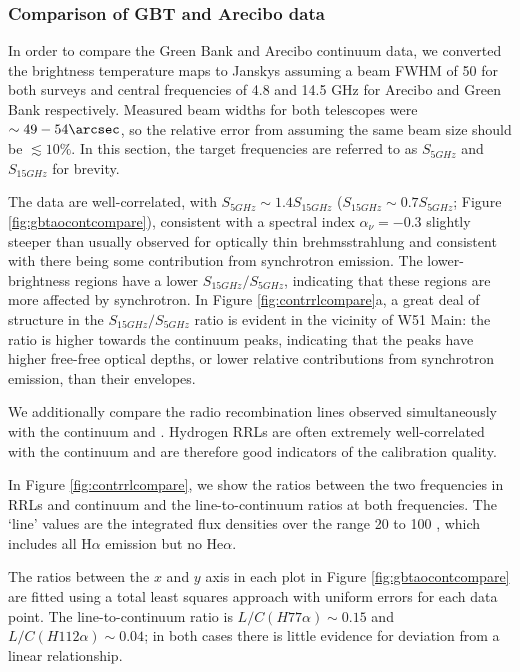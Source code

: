 \subsubsection{Comparison of GBT and Arecibo data}
In order to compare the Green Bank and Arecibo continuum data, we converted
the brightness temperature maps to Janskys assuming a beam FWHM of 50\arcsec
for both surveys and central frequencies of 4.8 and 14.5 GHz for Arecibo and
Green Bank respectively.  Measured beam widths for both telescopes were
$\sim49-54\arcsec$, so the relative error from assuming the same beam size
should be $\lesssim10\%$.
In this section, the target frequencies are referred
to as $S_{5 GHz}$ and $S_{15 GHz}$ for brevity.

The data are well-correlated, with $S_{5 GHz} \sim 1.4 S_{15 GHz}$ ($S_{15 GHz}
\sim 0.7 S_{5 GHz}$; Figure \ref{fig:gbtaocontcompare}), consistent with a
spectral index $\alpha_\nu=-0.3$
slightly steeper than usually observed for optically thin brehmsstrahlung and
consistent with there being some contribution from synchrotron emission.  The
lower-brightness regions have a lower $S_{15 GHz}/S_{5 GHz}$, indicating that
these regions are more affected by synchrotron.  In Figure
\ref{fig:contrrlcompare}a, a great deal of structure in the $S_{15 GHz}/S_{5
GHz}$ ratio is evident in the vicinity of W51 Main: the ratio is higher towards
the continuum peaks, indicating that the peaks have higher free-free optical
depths, or lower relative contributions from synchrotron emission, than their
envelopes.

We additionally compare the radio recombination lines observed simultaneously
with the continuum and \formaldehyde.  Hydrogen RRLs are often extremely
well-correlated with the continuum and are therefore good indicators of the
calibration quality.

In Figure \ref{fig:contrrlcompare}, we show the ratios between the two
frequencies in RRLs and continuum and the line-to-continuum ratios at both
frequencies.  The `line' values are the integrated flux densities over the
range 20 to 100 \kms, which includes all H$\alpha$ emission but no He$\alpha$.

The ratios between the $x$ and $y$ axis in each plot in Figure
\ref{fig:gbtaocontcompare} are fitted using a total least squares approach with
uniform errors for each data point.   The line-to-continuum ratio is
$L/C(H77\alpha)\sim0.15$ and $L/C(H112\alpha)\sim0.04$; in both cases there is
little evidence for deviation from a linear relationship.

